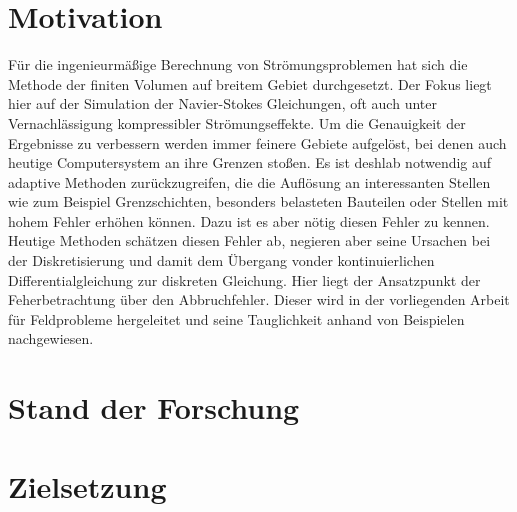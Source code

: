   \section{Motivation}
Für die ingenieurmäßige Berechnung von Strömungsproblemen hat sich die Methode der
finiten Volumen auf breitem Gebiet durchgesetzt. Der Fokus liegt hier auf der Simulation
der Navier-Stokes Gleichungen, oft auch unter Vernachlässigung kompressibler Strömungseffekte.
Um die Genauigkeit der Ergebnisse zu verbessern werden immer feinere Gebiete aufgelöst,
bei denen auch heutige Computersystem an ihre Grenzen stoßen. Es ist deshlab notwendig
auf adaptive Methoden zurückzugreifen, die die Auflösung an interessanten Stellen wie
zum Beispiel Grenzschichten, besonders belasteten Bauteilen oder Stellen mit hohem Fehler
erhöhen können. Dazu ist es aber nötig diesen Fehler zu kennen.
Heutige Methoden schätzen diesen Fehler ab, negieren aber seine Ursachen bei der Diskretisierung
und damit dem Übergang vonder kontinuierlichen Differentialgleichung zur diskreten Gleichung.
Hier liegt der Ansatzpunkt der Feherbetrachtung über den Abbruchfehler. Dieser wird in der
vorliegenden Arbeit für Feldprobleme hergeleitet und seine Tauglichkeit anhand
von Beispielen nachgewiesen.

  \section{Stand der Forschung}
  \section{Zielsetzung}
  \cleardoublepage
